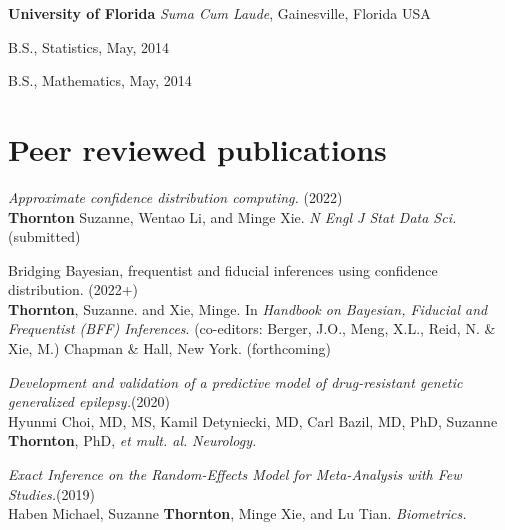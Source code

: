 \documentclass[margin,line]{res}
\newenvironment{list1}{
  \begin{list}{\ding{113}}{%
      \setlength{\itemsep}{0in}
      \setlength{\parsep}{0in} \setlength{\parskip}{0in}
      \setlength{\topsep}{0in} \setlength{\partopsep}{0in} 
      \setlength{\leftmargin}{0.17in}}}{\end{list}}
\begin{document}
\begin{resume}
\vspace*{-.1in}
{\bf University of Florida} \textit{Suma Cum Laude}, Gainesville, Florida USA\\
\vspace*{-.1in}
\begin{list1}
\item[] B.S., Statistics,  May, 2014
\item[] B.S., Mathematics, May, 2014
\end{list1}

\section{\sc Peer reviewed publications} 
{\it Approximate confidence distribution computing.} \hfill (2022)\\
{\bf Thornton} Suzanne, Wentao Li, and Minge Xie. {\em N Engl J Stat Data Sci.} (submitted) 
\vspace*{-2.5mm}

Bridging Bayesian, frequentist and fiducial inferences using confidence distribution. \hfill (2022+)\\
{\bf Thornton}, Suzanne. and Xie, Minge. In {\it Handbook on Bayesian, Fiducial and Frequentist (BFF) Inferences}. (co-editors: Berger, J.O., Meng, X.L., Reid, N. \& Xie, M.)  Chapman \& Hall, New York. (forthcoming) 
\vspace*{-2.5mm}

\textit{\small Development and validation of a predictive model of drug-resistant genetic generalized epilepsy.}\hfill(2020)\\
Hyunmi Choi, MD, MS, Kamil Detyniecki, MD, Carl Bazil, MD, PhD, Suzanne {\bf Thornton}, PhD, {\em et mult. al.}
{\em Neurology.} %
\vspace*{-2.5mm}

\textit{Exact Inference on the Random-Effects Model for Meta-Analysis with Few Studies.}\hfill(2019)\\
Haben Michael, Suzanne {\bf Thornton}, Minge Xie, and Lu Tian. {\em Biometrics.}
\vspace*{-2.5mm}



\end{resume}
\end{document}
